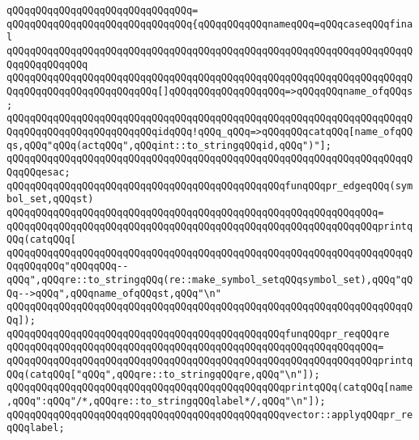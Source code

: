 \verb|qQQqqQQqqQQqqQQqqQQqqQQqqQQqqQQq=|\newline
\verb|qQQqqQQqqQQqqQQqqQQqqQQqqQQqqQQq{qQQqqQQqqQQqnameqQQq=qQQqcaseqQQqfinal|\newline
\verb|qQQqqQQqqQQqqQQqqQQqqQQqqQQqqQQqqQQqqQQqqQQqqQQqqQQqqQQqqQQqqQQqqQQqqQQqqQQqqQQqqQQq|\newline
\verb|qQQqqQQqqQQqqQQqqQQqqQQqqQQqqQQqqQQqqQQqqQQqqQQqqQQqqQQqqQQqqQQqqQQqqQQqqQQqqQQqqQQqqQQqqQQqqQQq[]qQQqqQQqqQQqqQQqqQQq=>qQQqqQQqname_ofqQQqs;|\newline
\verb|qQQqqQQqqQQqqQQqqQQqqQQqqQQqqQQqqQQqqQQqqQQqqQQqqQQqqQQqqQQqqQQqqQQqqQQqqQQqqQQqqQQqqQQqqQQqqQQqidqQQq!qQQq_qQQq=>qQQqqQQqcatqQQq[name_ofqQQqs,qQQq"qQQq(actqQQq",qQQqint::to_stringqQQqid,qQQq")"];|\newline
\verb|qQQqqQQqqQQqqQQqqQQqqQQqqQQqqQQqqQQqqQQqqQQqqQQqqQQqqQQqqQQqqQQqqQQqqQQqqQQqesac;|\newline
\newline
\verb|qQQqqQQqqQQqqQQqqQQqqQQqqQQqqQQqqQQqqQQqqQQqqQQqfunqQQqpr_edgeqQQq(symbol_set,qQQqst)|\newline
\verb|qQQqqQQqqQQqqQQqqQQqqQQqqQQqqQQqqQQqqQQqqQQqqQQqqQQqqQQqqQQqqQQq=|\newline
\verb|qQQqqQQqqQQqqQQqqQQqqQQqqQQqqQQqqQQqqQQqqQQqqQQqqQQqqQQqqQQqqQQqprintqQQq(catqQQq[|\newline
\verb|qQQqqQQqqQQqqQQqqQQqqQQqqQQqqQQqqQQqqQQqqQQqqQQqqQQqqQQqqQQqqQQqqQQqqQQqqQQqqQQq"qQQqqQQq--qQQq",qQQqre::to_stringqQQq(re::make_symbol_setqQQqsymbol_set),qQQq"qQQq-->qQQq",qQQqname_ofqQQqst,qQQq"\n"|\newline
\verb|qQQqqQQqqQQqqQQqqQQqqQQqqQQqqQQqqQQqqQQqqQQqqQQqqQQqqQQqqQQqqQQqqQQqqQQq]);|\newline
\newline
\verb|qQQqqQQqqQQqqQQqqQQqqQQqqQQqqQQqqQQqqQQqqQQqqQQqfunqQQqpr_reqQQqre|\newline
\verb|qQQqqQQqqQQqqQQqqQQqqQQqqQQqqQQqqQQqqQQqqQQqqQQqqQQqqQQqqQQqqQQq=|\newline
\verb|qQQqqQQqqQQqqQQqqQQqqQQqqQQqqQQqqQQqqQQqqQQqqQQqqQQqqQQqqQQqqQQqprintqQQq(catqQQq["qQQq",qQQqre::to_stringqQQqre,qQQq"\n"]);|\newline
\newline
\verb|qQQqqQQqqQQqqQQqqQQqqQQqqQQqqQQqqQQqqQQqqQQqqQQqprintqQQq(catqQQq[name,qQQq":qQQq"/*,qQQqre::to_stringqQQqlabel*/,qQQq"\n"]);|\newline
\verb|qQQqqQQqqQQqqQQqqQQqqQQqqQQqqQQqqQQqqQQqqQQqqQQqvector::applyqQQqpr_reqQQqlabel;|\newline
